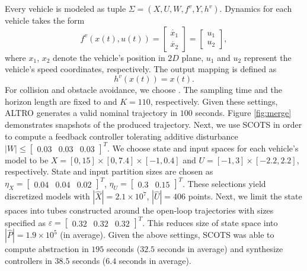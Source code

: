 Every vehicle is modeled as tuple $\Sigma=(X,U,W,f^v,Y,h^v)$. 
Dynamics for each vehicle takes the form
\begin{equation*}\label{eq:vehicle_ss}
	f^{v}(x(t),u(t))=
	\begin{bmatrix}
		\dot{x_1}\\
		\dot{x_2}
	\end{bmatrix}=
	\begin{bmatrix}
		u_1\\
		u_2
	\end{bmatrix},
\end{equation*}
where $x_1$, $x_2$ denote the vehicle's position in $2D$ plane, $u_1$ and $u_2$ represent the vehicle's speed coordinates, respectively. The output mapping is defined as
\[
h^v(x(t))=x(t).
\]
For collision and obstacle avoidance, we choose . The sampling time and the horizon length are fixed to  and $K=110$, respectively. Given these settings, ALTRO generates a valid nominal trajectory in $100$ seconds. Figure \ref{fig:merge} demonstrates snapshots of the produced trajectory. Next, we use SCOTS in order to compute a feedback controller tolerating additive disturbance $|W|\leq\begin{bmatrix}0.03&0.03&0.03\end{bmatrix}^T$. We choose state and input spaces for each vehicle's model to be $X=[0,15]\times[0,7.4]\times[-1,0.4]$ and $U=[-1,3]\times[-2.2,2.2]$, respectively. State and input partition sizes are chosen as $\eta_{X}=\begin{bmatrix}0.04&0.04&0.02\end{bmatrix}^T$, $\eta_{U}=\begin{bmatrix}0.3&0.15\end{bmatrix}^T$. These selections yield discretized models with $|\hat X|=2.1\times 10^7$, $|\hat U|=406$ points. Next, we limit the state spaces into tubes constructed around the open-loop trajectories with sizes specified as $\varepsilon=\begin{bmatrix}0.32&0.32&0.32\end{bmatrix}^T$. This reduces size of state space into $|\hat P|=1.9\times 10^5$ (in average). Given the above settings, SCOTS was able to compute abstraction in $195$ seconds ($32.5$ seconds in average) and synthesize controllers in $38.5$ seconds ($6.4$ seconds in average).




